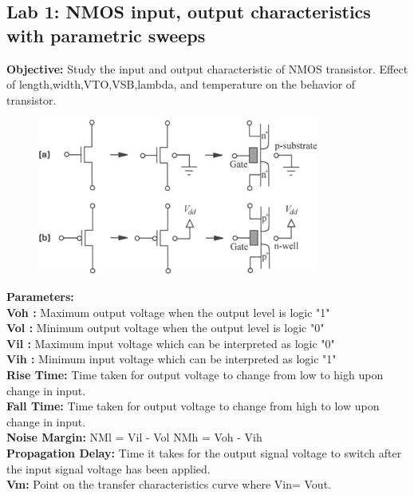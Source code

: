 \documentclass[12pt,a4paper]{article}
\begin{document}
\begin{center}
\section{Lab 1: NMOS input, output characteristics with parametric sweeps}
{\bf{Objective:}} 
Study the input and output characteristic of NMOS transistor. Effect of length,width,VTO,VSB,lambda, and temperature on the behavior of transistor. 
\vspace{5pt}

\begin{figure}[!h]
\centering
\includegraphics[scale=1.0]{nmos1.jpg}
\end{figure}
\end{center}
\textbf{Parameters:}  
\\ \textbf{Voh :} Maximum output voltage when the output level is logic "1" \\ \textbf{Vol :} Minimum output voltage when the output level is logic "0"  
\\ \textbf{Vil :} Maximum input voltage which can be interpreted as logic "0"  
\\ \textbf{Vih :} Minimum input voltage which can be interpreted as logic "1"  
\\ \textbf{Rise Time:} Time taken for output voltage to change from low to high upon change in input. 
\\ \textbf{Fall Time:} Time taken for output voltage to change from high to low upon change in input.  
\\ \textbf{Noise Margin:}  NMl = Vil - Vol  NMh = Voh - Vih
\\ \textbf{Propagation Delay:} Time it takes for the output signal voltage to switch after the input signal voltage has been applied.  
\\ \textbf{Vm:} Point on the transfer characteristics curve where Vin= Vout. 
\end{document}
